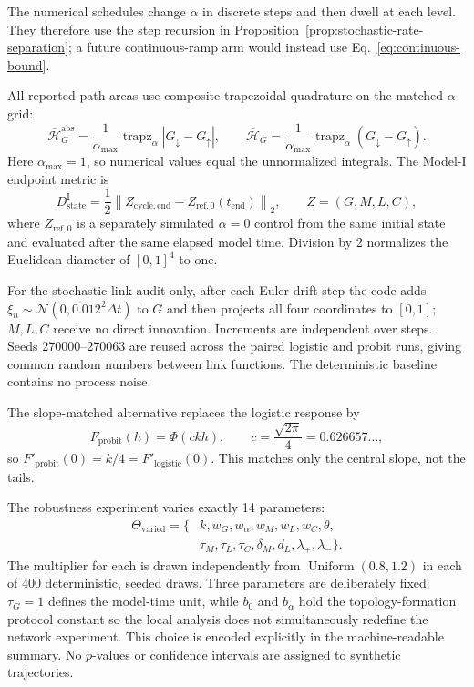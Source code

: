 \documentclass[10pt,a4paper]{article}
\begin{document}
The numerical schedules change $\alpha$ in discrete steps and then dwell at each level. They therefore use the step recursion in Proposition~\ref{prop:stochastic-rate-separation}; a future continuous-ramp arm would instead use Eq.~\eqref{eq:continuous-bound}.

All reported path areas use composite trapezoidal quadrature on the matched $\alpha$ grid:
\begin{equation}
\overline{\mathcal H}^{\mathrm{abs}}_G
=\frac{1}{\alpha_{\max}}\operatorname{trapz}_{\alpha}|G_\downarrow-G_\uparrow|,
\qquad
\overline{\mathcal H}_G
=\frac{1}{\alpha_{\max}}\operatorname{trapz}_{\alpha}(G_\downarrow-G_\uparrow).
\label{eq:numerical-area}
\end{equation}
Here $\alpha_{\max}=1$, so numerical values equal the unnormalized integrals. The Model-I endpoint metric is
\begin{equation}
D_{\mathrm{state}}^{\mathrm I}
=\frac12\left\|Z_{\mathrm{cycle,end}}-Z_{\mathrm{ref},0}(t_{\mathrm{end}})\right\|_2,
\qquad Z=(G,M,L,C),
\label{eq:model-i-state-deficit}
\end{equation}
where $Z_{\mathrm{ref},0}$ is a separately simulated $\alpha=0$ control from the same initial state and evaluated after the same elapsed model time. Division by 2 normalizes the Euclidean diameter of $[0,1]^4$ to one.

For the stochastic link audit only, after each Euler drift step the code adds $\xi_n\sim\mathcal N(0,0.012^2\Delta t)$ to $G$ and then projects all four coordinates to $[0,1]$; $M,L,C$ receive no direct innovation. Increments are independent over steps. Seeds 270000--270063 are reused across the paired logistic and probit runs, giving common random numbers between link functions. The deterministic baseline contains no process noise.

The slope-matched alternative replaces the logistic response by
\begin{equation}
F_{\mathrm{probit}}(h)=\Phi(c k h),
\qquad c=\frac{\sqrt{2\pi}}{4}=0.626657\ldots,
\end{equation}
so $F'_{\mathrm{probit}}(0)=k/4=F'_{\mathrm{logistic}}(0)$. This matches only the central slope, not the tails.

The robustness experiment varies exactly 14 parameters:
\begin{equation}
\begin{aligned}
\Theta_{\mathrm{varied}}=\{&k,w_G,w_\alpha,w_M,w_L,w_C,\theta,\\
&\tau_M,\tau_L,\tau_C,\delta_M,d_L,\lambda_+,\lambda_-\}.
\end{aligned}
\end{equation}
The multiplier for each is drawn independently from $\operatorname{Uniform}(0.8,1.2)$ in each of 400 deterministic, seeded draws. Three parameters are deliberately fixed: $\tau_G=1$ defines the model-time unit, while $b_0$ and $b_\alpha$ hold the topology-formation protocol constant so the local analysis does not simultaneously redefine the network experiment. This choice is encoded explicitly in the machine-readable summary. No $p$-values or confidence intervals are assigned to synthetic trajectories.
\end{document}
